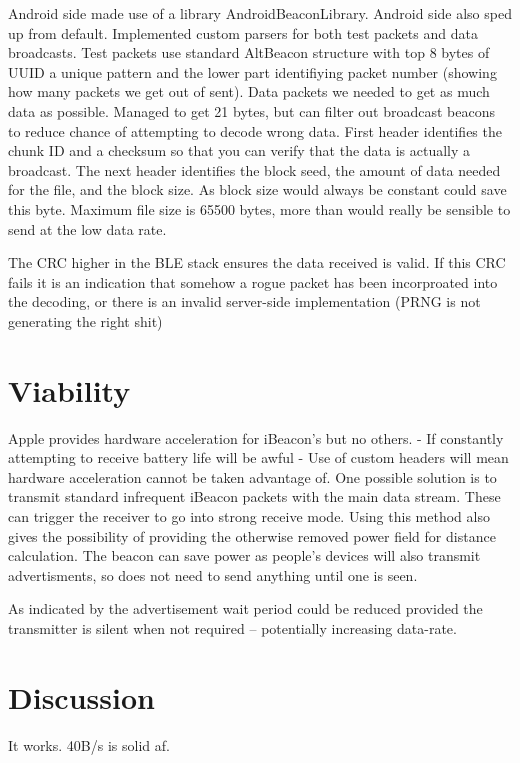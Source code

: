 \documentclass[conference]{IEEEtran} %
\begin{document}
Android side made use of a library AndroidBeaconLibrary. Android side also sped up from default. Implemented custom parsers for both test packets and data broadcasts. Test packets use standard AltBeacon structure with top 8 bytes of UUID a unique pattern and the lower part identifiying packet number (showing how many packets we get out of sent). Data packets we needed to get as much data as possible. Managed to get 21 bytes, but can filter out broadcast beacons to reduce chance of attempting to decode wrong data. First header identifies the chunk ID and a checksum so that you can verify that the data is actually a broadcast. The next header identifies the block seed, the amount of data needed for the file, and the block size. As block size would always be constant could save this byte. Maximum file size is 65500 bytes, more than would really be sensible to send at the low data rate.



The CRC higher in the BLE stack ensures the data received is valid.
If this CRC fails it is an indication that somehow a rogue packet has been incorproated into the decoding, or there is an invalid server-side implementation (PRNG is not generating the right shit)



\section{Viability}
Apple provides hardware acceleration for iBeacon's but no others.
- If constantly attempting to receive battery life will be awful
- Use of custom headers will mean hardware acceleration cannot be taken advantage of. One possible solution is to transmit standard infrequent iBeacon packets with the main data stream. These can trigger the receiver to go into strong receive mode. Using this method also gives the possibility of providing the otherwise removed power field for distance calculation.
The beacon can save power as people's devices will also transmit advertisments, so does not need to send anything until one is seen.

As indicated by \cite[p. 2178]{BT:CORE_SPEC} the advertisement wait period could be reduced provided the transmitter is silent when not required -- potentially increasing data-rate.


\section{Discussion}
It works. 40B/s is solid af.
\end{document}
